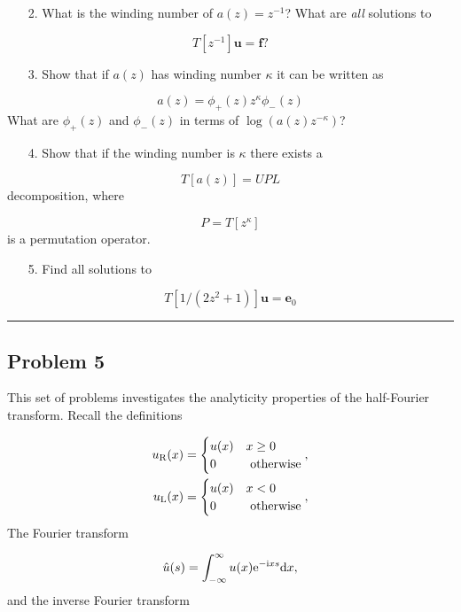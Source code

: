 \documentclass[12pt,a4paper]{article}
\def\D{ {\rm d} }
\def\I{ {\rm i} }
\def\E{ {\rm e} }
\def\vc#1{ {\mathbf #1} }
\def\dx{\D x}
\begin{document}
\begin{itemize}
\item[2. ] What is the winding number of $a(z) = z^{-1}$? What are \emph{all} solutions to

\end{itemize}
\[
T[z^{-1}] \vc u = \vc f?
\]
\begin{itemize}
\item[3. ] Show that if $a(z)$ has winding number $\kappa$ it can be written as

\end{itemize}
\[
a(z) = \phi_+(z) z^{\kappa} \phi_-(z)
\]
What are $\phi_+(z)$ and $\phi_-(z)$ in terms of $\log(a(z) z^{-\kappa})$?

\begin{itemize}
\item[4. ] Show that if the winding number is $\kappa$ there exists a

\end{itemize}
\[
T[a(z)] = UPL
\]
decomposition, where

\[
P = T[z^\kappa]
\]
is a permutation operator.

\begin{itemize}
\item[5. ] Find all solutions to

\end{itemize}
\[
T[1/(2z^2+1)] \vc u = \vc e_0
\]
\rule{\textwidth}{1pt}
\subsection{Problem 5}
This set of problems investigates the analyticity properties of the half-Fourier transform.  Recall the definitions


\begin{align*}
	u_{\rm R}(x) & = \begin{cases} u(x) & x \geq 0 \\
	                             0 & \text{ otherwise}
															 \end{cases}, \\
	u_{\rm L}(x) & = \begin{cases} u(x) & x < 0 \\
	                         0 &\text{ otherwise}
													 \end{cases},
\end{align*}
The Fourier transform

\[
\hat u(s) = \int_{-\infty}^\infty u(x) \E^{-\I x s} \dx,
\]
and the inverse Fourier transform
\end{document}
